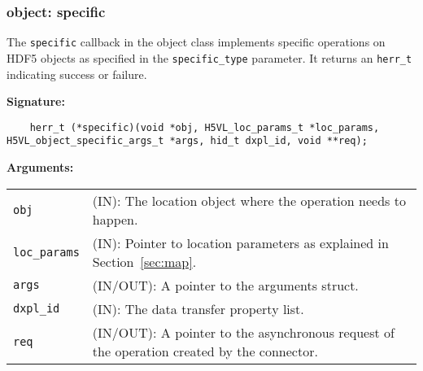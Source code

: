 \subsubsection{object: specific}
The \texttt{specific} callback in the object class implements specific operations on HDF5 objects as specified in the \texttt{specific\_type} parameter. It returns an \texttt{herr\_t} indicating success or failure.\bigskip

\begin{mdframed}[style=bgbox]
\textbf{Signature:}
\begin{lstlisting}
	herr_t (*specific)(void *obj, H5VL_loc_params_t *loc_params, H5VL_object_specific_args_t *args, hid_t dxpl_id, void **req);
\end{lstlisting}

\textbf{Arguments:}\\
\begin{tabular}{l p{13.5cm}}
  \texttt{obj} & (IN): The location object  where the operation needs to happen.\\
  \texttt{loc\_params} & (IN): Pointer to location parameters as explained in Section~\ref{sec:map}.\\
  \texttt{args} & (IN/OUT): A pointer to the arguments struct.\\
  \texttt{dxpl\_id} & (IN): The data transfer property list.\\
  \texttt{req} & (IN/OUT): A pointer to the asynchronous request of the
  operation created by the connector.\\
\end{tabular}
\end{mdframed}

